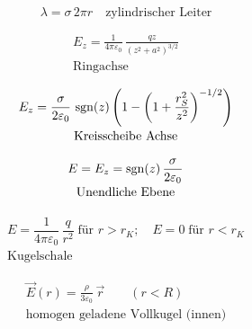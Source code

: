 \begin{formulabox}
\[ \lambda = \sigma\,2\pi r \quad \text{zylindrischer Leiter} \]
\end{formulabox}

\begin{formulabox}
\[
\begin{gathered}
E_z = \frac{1}{4\pi\varepsilon_0}\,\frac{qz}{(z^2+a^2)^{3/2}} \\[-2pt]
\text{Ringachse}
\end{gathered}
\]
\end{formulabox}

\begin{formulabox}
\[
\begin{gathered}
E_z = \frac{\sigma}{2\varepsilon_0}\,\operatorname{sgn}(z)\left(1 - \left(1+\frac{r_S^2}{z^2}\right)^{-1/2}\right) \\[-2pt]
\text{Kreisscheibe Achse}
\end{gathered}
\]
\end{formulabox}

\begin{formulabox}
\[
\begin{gathered}
E = E_z = \operatorname{sgn}(z)\,\frac{\sigma}{2\varepsilon_0} \\[-2pt]
\text{Unendliche Ebene}
\end{gathered}
\]
\end{formulabox}

\begin{formulabox}
\[
\begin{gathered}
E = \dfrac{1}{4\pi\varepsilon_0}\,\dfrac{q}{r^2}\;\text{für $r>r_K$};\quad E=0\;\text{für $r<r_K$} \\[-2pt]
\text{Kugelschale}
\end{gathered}
\]
\end{formulabox}

\begin{formulabox}
\[
\begin{gathered}
\vec{E}(r) = \frac{\rho}{3\varepsilon_0}\,\vec{r} \qquad (r<R) \\[-2pt]
\text{homogen geladene Vollkugel (innen)}
\end{gathered}
\]
\end{formulabox}

